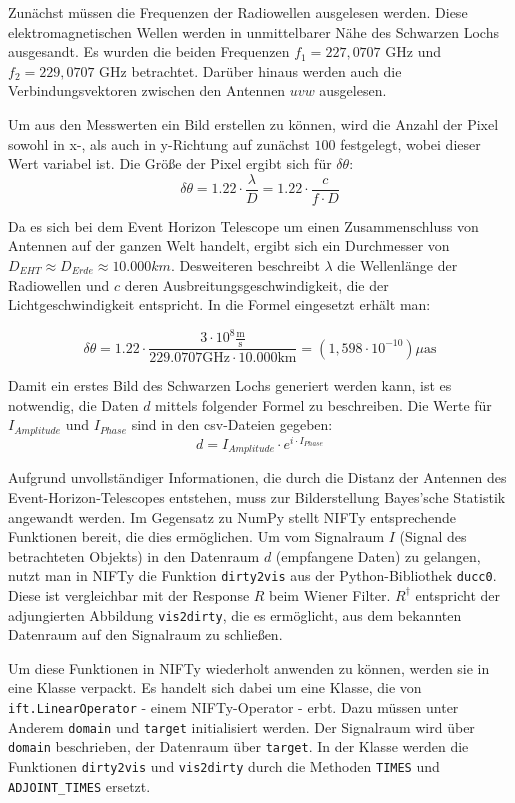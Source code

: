 Zunächst müssen die Frequenzen der Radiowellen ausgelesen werden. Diese elektromagnetischen Wellen werden in unmittelbarer Nähe des Schwarzen Lochs ausgesandt. Es wurden die beiden Frequenzen $f_1 = 227,0707$ GHz und $f_2 = 229,0707$ GHz betrachtet. Darüber hinaus werden auch die Verbindungsvektoren zwischen den Antennen $uvw$ ausgelesen.

Um aus den Messwerten ein Bild erstellen zu können, wird die Anzahl der Pixel sowohl in x-, als auch in y-Richtung auf zunächst $100$ festgelegt, wobei dieser Wert variabel ist. Die Größe der Pixel ergibt sich für $\delta \theta$:
\[ \delta \theta = 1.22 \cdot \displaystyle\frac{\lambda}{D} = 1.22 \cdot \displaystyle\frac{c}{f \cdot D} \]

Da es sich bei dem Event Horizon Telescope um einen Zusammenschluss von Antennen auf der ganzen Welt handelt, ergibt sich ein Durchmesser von $D_{EHT} \approx D_{Erde} \approx 10.000km$. Desweiteren beschreibt $\lambda$ die Wellenlänge der Radiowellen und $c$ deren Ausbreitungsgeschwindigkeit, die der Lichtgeschwindigkeit entspricht. In die Formel eingesetzt erhält man:

\begin{equation}
  \delta \theta = 1.22 \cdot \displaystyle\frac{3 \cdot 10^{8} \displaystyle\frac{\text{m}}{\text{s}}} {229.0707 \text{GHz} \cdot 10.000 \text{km}} = (1,598 \cdot 10^{-10}) \mu \text{as} 
\end{equation}

Damit ein erstes Bild des Schwarzen Lochs generiert werden kann, ist es notwendig, die Daten $d$ mittels folgender Formel zu beschreiben. Die Werte für $I_{Amplitude}$ und $I_{Phase}$ sind in den csv-Dateien gegeben:
\[ d = I_{Amplitude} \cdot e^{i \cdot I_{Phase}} \]

Aufgrund unvollständiger Informationen, die durch die Distanz der Antennen des Event-Horizon-Telescopes entstehen, muss zur Bilderstellung Bayes'sche Statistik angewandt werden. Im Gegensatz zu NumPy stellt NIFTy entsprechende Funktionen bereit, die dies ermöglichen. Um vom Signalraum $I$ (Signal des betrachteten Objekts) in den Datenraum $d$ (empfangene Daten) zu gelangen, nutzt man in NIFTy die Funktion \verb|dirty2vis| aus der Python-Bibliothek \verb|ducc0|. Diese ist vergleichbar mit der Response $R$ beim Wiener Filter. $R^{\dagger}$ entspricht der adjungierten Abbildung \verb|vis2dirty|, die es ermöglicht, aus dem bekannten Datenraum auf den Signalraum zu schließen.

Um diese Funktionen in NIFTy wiederholt anwenden zu können, werden sie in eine Klasse verpackt. Es handelt sich dabei um eine Klasse, die von \verb|ift.LinearOperator| - einem NIFTy-Operator - erbt. Dazu müssen unter Anderem \verb|domain| und \verb|target| initialisiert werden. Der Signalraum wird über \verb|domain| beschrieben, der Datenraum über \verb|target|. In der Klasse werden die Funktionen \verb|dirty2vis| und \verb|vis2dirty| durch die Methoden \verb|TIMES| und \verb|ADJOINT_TIMES| ersetzt.
